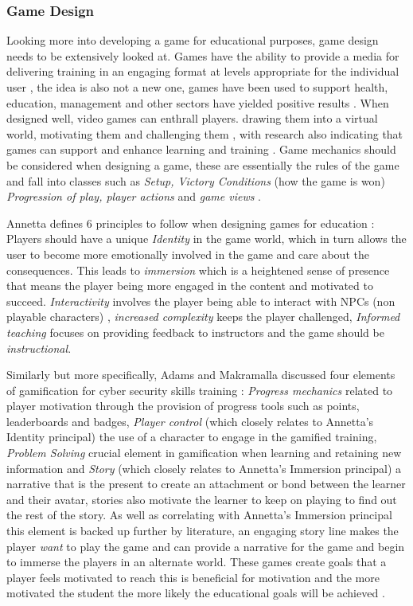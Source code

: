 \documentclass[12pt,a4paper]{article}
\begin{document}
\subsubsection{Game Design} 
Looking more into developing a game for educational purposes, game design needs to be extensively looked at. Games have the ability to provide a media for delivering training in an engaging format at levels appropriate for the individual user \cite{nagarajan2012exploring1}, the idea is also not a new one, games have been used to support health, education, management and other sectors have yielded positive results \cite{prensky2003digital}. When designed well, video games can enthrall players. drawing them into a virtual world, motivating them and challenging them \cite{nagarajan2012exploring2}, with research also indicating that games can support and enhance learning and training \cite{cone2007video}. Game mechanics should be considered when designing a game, these are essentially the rules of the game and fall into classes such as \emph{Setup, Victory Conditions} (how the game is won) \emph{Progression of play, player actions} and  \emph{game views} \cite{nagarajan2012exploring4}.

Annetta defines 6 principles to follow when designing games for education \cite{annetta2010s1}: Players should have a unique \emph{Identity} in the game world, which in turn allows the user to become more emotionally involved in the game and care about the consequences. This leads to \emph{immersion} which is a heightened sense of presence that means the player being more engaged in the content and motivated to succeed. \emph{Interactivity} involves the player being able to interact with NPCs (non playable characters) , \emph{increased complexity} keeps the player challenged, \emph{Informed teaching} focuses on providing feedback to instructors and the game should be \emph{instructional}. 

Similarly but more specifically, Adams and Makramalla discussed four elements of gamification for cyber security skills training \cite{adams2015cybersecurity1}: \emph{Progress mechanics} related to player motivation through the provision of progress tools such as points, leaderboards and badges, \emph{Player control} (which closely relates to Annetta's Identity principal) the use of a character to engage in the gamified training, \emph{Problem Solving} crucial element in gamification when learning and retaining new information and \emph{Story} (which closely relates to Annetta's Immersion principal) a narrative that is the present to create an attachment or bond between the learner and their avatar, stories also motivate the learner to keep on playing to find out the rest of the story. As well as correlating with Annetta's Immersion principal this element is backed up further by literature, an engaging story line makes the player \emph{want} to play the game \cite{buchanan2011blending1} and can provide a narrative for the game and begin to immerse the players in an alternate world. These games create goals that a player feels motivated to reach \cite{nagarajan2012exploring3} this is beneficial for motivation and the more motivated the student the more likely the educational goals will be achieved \cite{albert2010high1}.   
\end{document}

